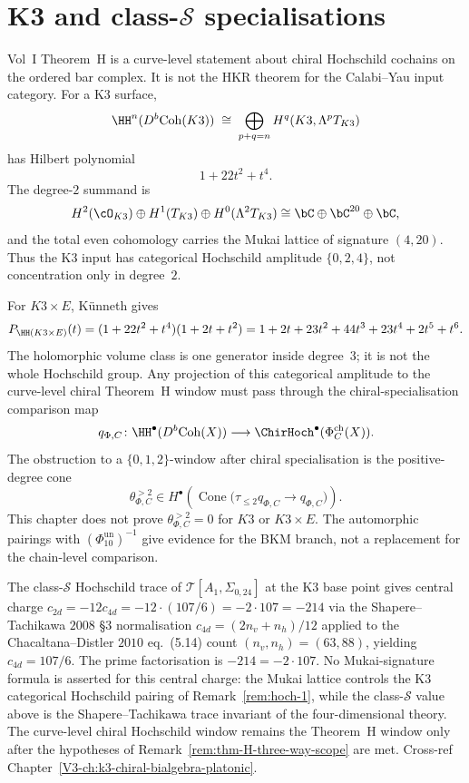 \section{K3 and class-\texorpdfstring{$\mathcal S$}{S} specialisations}
\label{sec:hoch-supplement}

\begin{remark}
\label{rem:hoch-1}
Vol~I Theorem~H is a curve-level statement about chiral Hochschild
cochains on the ordered bar complex. It is not the HKR theorem for
the Calabi--Yau input category. For a K3 surface,
\[
\HH^n(D^b\mathrm{Coh}(K3))
\;\cong\;
\bigoplus_{p+q=n}H^q(K3,\Lambda^pT_{K3})
\]
has Hilbert polynomial
\[
 1+22t^2+t^4 .
\]
The degree-$2$ summand is
\[
H^2(\cO_{K3})\oplus H^1(T_{K3})\oplus H^0(\Lambda^2T_{K3})
\cong \bC\oplus\bC^{20}\oplus\bC,
\]
and the total even cohomology carries the Mukai lattice of signature
$(4,20)$. Thus the K3 input has categorical Hochschild amplitude
\(\{0,2,4\}\), not concentration only in degree~$2$.

For \(K3\times E\), K\"unneth gives
\[
P_{\HH(K3\times E)}(t)
=
(1+22t^2+t^4)(1+2t+t^2)
=
1+2t+23t^2+44t^3+23t^4+2t^5+t^6 .
\]
The holomorphic volume class is one generator inside degree~$3$; it is
not the whole Hochschild group. Any projection of this categorical
amplitude to the curve-level chiral Theorem~H window must pass through
the chiral-specialisation comparison map
\[
 q_{\Phi,C}\colon
 \HH^\bullet(D^b\mathrm{Coh}(X))
 \longrightarrow
 \ChirHoch^\bullet(\Phi^{\mathrm{ch}}_C(X)).
\]
The obstruction to a \(\{0,1,2\}\)-window after chiral specialisation is
the positive-degree cone
\[
 \theta_{\Phi,C}^{>2}
 \in
 H^\bullet\!\left(\operatorname{Cone}
 \bigl(\tau_{\le 2}q_{\Phi,C}\to q_{\Phi,C}\bigr)\right).
\]
This chapter does not prove \(\theta_{\Phi,C}^{>2}=0\) for \(K3\) or
\(K3\times E\). The automorphic pairings with
\((\Phi_{10}^{\mathrm{un}})^{-1}\) give evidence for the BKM branch,
not a replacement for the chain-level comparison.
\end{remark}

\begin{remark}[Class-$\mathcal S$ Hochschild trace at $c_{2d} = -214$]
\label{rem:hoch-2}
The class-$\mathcal S$ Hochschild trace of $\mathcal T[A_1,\Sigma_{0,24}]$
at the K3 base point gives central charge
$c_{2d} = -12 c_{4d} = -12\cdot(107/6) = -2\cdot 107 = -214$ via the
Shapere--Tachikawa $2008$ \S 3 normalisation
$c_{4d} = (2n_v + n_h)/12$ applied to the Chacaltana--Distler $2010$
eq.~(5.14) count $(n_v, n_h) = (63, 88)$, yielding $c_{4d} = 107/6$.
The prime factorisation is \( -214=-2\cdot107\). No Mukai-signature
formula is asserted for this central charge: the Mukai lattice controls
the K3 categorical Hochschild pairing of
Remark~\ref{rem:hoch-1}, while the class-\(\mathcal S\) value above is
the Shapere--Tachikawa trace invariant of the four-dimensional theory.
The curve-level chiral Hochschild window remains the Theorem~H window
only after the hypotheses of Remark~\ref{rem:thm-H-three-way-scope} are
met.
Cross-ref Chapter~\ref{V3-ch:k3-chiral-bialgebra-platonic}.
\end{remark}
